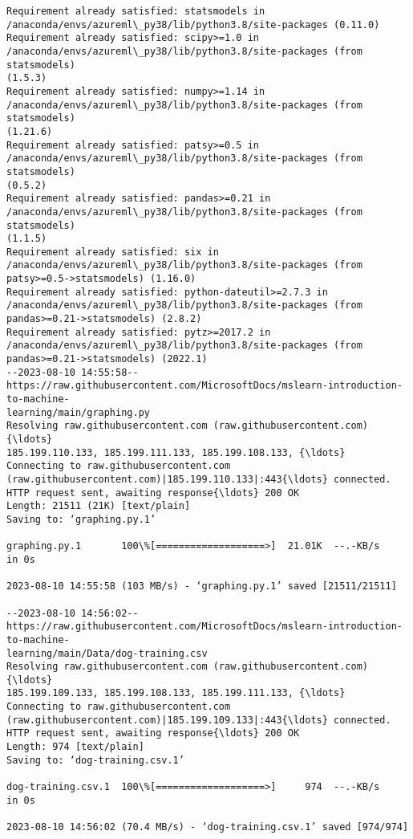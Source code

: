 \documentclass[11pt]{article}
\begin{document}
    \begin{Verbatim}[commandchars=\\\{\}]
Requirement already satisfied: statsmodels in
/anaconda/envs/azureml\_py38/lib/python3.8/site-packages (0.11.0)
Requirement already satisfied: scipy>=1.0 in
/anaconda/envs/azureml\_py38/lib/python3.8/site-packages (from statsmodels)
(1.5.3)
Requirement already satisfied: numpy>=1.14 in
/anaconda/envs/azureml\_py38/lib/python3.8/site-packages (from statsmodels)
(1.21.6)
Requirement already satisfied: patsy>=0.5 in
/anaconda/envs/azureml\_py38/lib/python3.8/site-packages (from statsmodels)
(0.5.2)
Requirement already satisfied: pandas>=0.21 in
/anaconda/envs/azureml\_py38/lib/python3.8/site-packages (from statsmodels)
(1.1.5)
Requirement already satisfied: six in
/anaconda/envs/azureml\_py38/lib/python3.8/site-packages (from
patsy>=0.5->statsmodels) (1.16.0)
Requirement already satisfied: python-dateutil>=2.7.3 in
/anaconda/envs/azureml\_py38/lib/python3.8/site-packages (from
pandas>=0.21->statsmodels) (2.8.2)
Requirement already satisfied: pytz>=2017.2 in
/anaconda/envs/azureml\_py38/lib/python3.8/site-packages (from
pandas>=0.21->statsmodels) (2022.1)
--2023-08-10 14:55:58--
https://raw.githubusercontent.com/MicrosoftDocs/mslearn-introduction-to-machine-
learning/main/graphing.py
Resolving raw.githubusercontent.com (raw.githubusercontent.com){\ldots}
185.199.110.133, 185.199.111.133, 185.199.108.133, {\ldots}
Connecting to raw.githubusercontent.com
(raw.githubusercontent.com)|185.199.110.133|:443{\ldots} connected.
HTTP request sent, awaiting response{\ldots} 200 OK
Length: 21511 (21K) [text/plain]
Saving to: ‘graphing.py.1’

graphing.py.1       100\%[===================>]  21.01K  --.-KB/s    in 0s

2023-08-10 14:55:58 (103 MB/s) - ‘graphing.py.1’ saved [21511/21511]

--2023-08-10 14:56:02--
https://raw.githubusercontent.com/MicrosoftDocs/mslearn-introduction-to-machine-
learning/main/Data/dog-training.csv
Resolving raw.githubusercontent.com (raw.githubusercontent.com){\ldots}
185.199.109.133, 185.199.108.133, 185.199.111.133, {\ldots}
Connecting to raw.githubusercontent.com
(raw.githubusercontent.com)|185.199.109.133|:443{\ldots} connected.
HTTP request sent, awaiting response{\ldots} 200 OK
Length: 974 [text/plain]
Saving to: ‘dog-training.csv.1’

dog-training.csv.1  100\%[===================>]     974  --.-KB/s    in 0s

2023-08-10 14:56:02 (70.4 MB/s) - ‘dog-training.csv.1’ saved [974/974]


\end{Verbatim}
\end{document}
